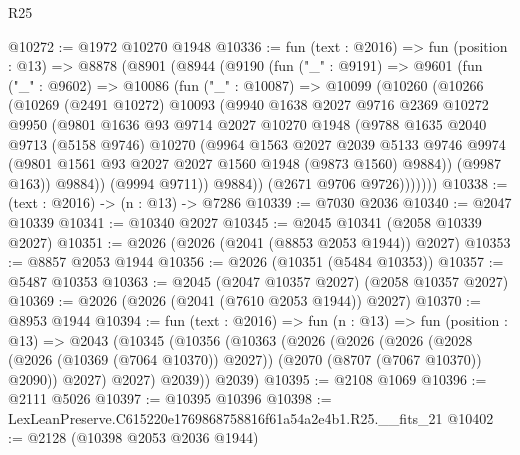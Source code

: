 \begin{lexlean}{R25}
\begin{coremodule}
@10272 := @1972 @10270 @1948
@10336 := fun (text : @2016) =>
  fun (position : @13) =>
  @8878
    (@8901
      (@8944
        (@9190
          (fun ("_" : @9191) =>
          @9601
            (fun ("_" : @9602) =>
            @10086
              (fun ("_" : @10087) =>
              @10099
                (@10260
                  (@10266
                    (@10269
                      (@2491 @10272)
                      @10093
                      (@9940
                        @1638
                        @2027
                        @9716
                        @2369
                        @10272
                        @9950
                        (@9801
                          @1636
                          @93
                          @9714
                          @2027
                          @10270
                          @1948
                          (@9788
                            @1635
                            @2040
                            @9713
                            (@5158 @9746)
                            @10270
                            (@9964
                              @1563
                              @2027
                              @2039
                              @5133
                              @9746
                              @9974
                              (@9801 @1561 @93 @2027 @2027 @1560 @1948 (@9873 @1560) @9884))
                            (@9987 @163))
                          @9884))
                      (@9994 @9711))
                    @9884))
                (@2671 @9706 @9726)))))))
@10338 := (text : @2016) -> (n : @13) -> @7286
@10339 := @7030 @2036
@10340 := @2047 @10339
@10341 := @10340 @2027
@10345 := @2045 @10341 (@2058 @10339 @2027)
@10351 := @2026 (@2026 (@2041 (@8853 @2053 @1944)) @2027)
@10353 := @8857 @2053 @1944
@10356 := @2026 (@10351 (@5484 @10353))
@10357 := @5487 @10353
@10363 := @2045 (@2047 @10357 @2027) (@2058 @10357 @2027)
@10369 := @2026 (@2026 (@2041 (@7610 @2053 @1944)) @2027)
@10370 := @8953 @1944
@10394 := fun (text : @2016) =>
  fun (n : @13) =>
  fun (position : @13) =>
  @2043
    (@10345
      (@10356
        (@10363
          (@2026
            (@2026
              (@2026
                (@2028 (@2026 (@10369 (@7064 @10370)) @2027))
                (@2070 (@8707 (@7067 @10370)) @2090))
              @2027)
            @2027)
          @2039))
      @2039)
@10395 := @2108 @1069
@10396 := @2111 @5026
@10397 := @10395 @10396
@10398 := LexLeanPreserve.C615220e1769868758816f61a54a2e4b1.R25.__fits_21
@10402 := @2128 (@10398 @2053 @2036 @1944)

\end{coremodule}
\end{lexlean}

